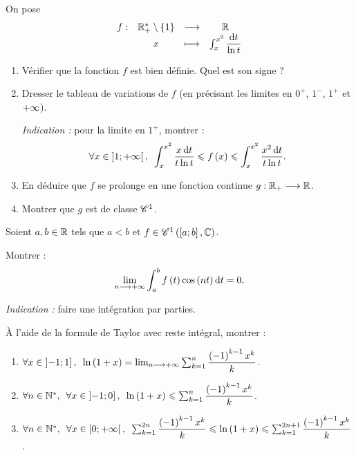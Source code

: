 \begin{exo}
On pose \[\fonction{f}{\Rps\excluant\accol{1}}{\R}{x}{\int_x^{x^2}\dfrac{\odif{t}}{\ln t}}\]

\begin{enumerate}
\item Vérifier que la fonction \(f\) est bien définie. Quel est son signe ? \\

\item Dresser le tableau de variations de \(f\) (en précisant les limites en \(0^+\), \(1^-\), \(1^+\) et \(+\infty\)).

\textit{Indication :} pour la limite en \(1^+\), montrer : \[\quantifs{\forall x\in\intervee{1}{\pinf}}\int_x^{x^2}\dfrac{x\odif{t}}{t\ln t}\leq f\paren{x}\leq\int_x^{x^2}\dfrac{x^2\odif{t}}{t\ln t}.\]

\item En déduire que \(f\) se prolonge en une fonction continue \(g:\mathbb{R}_+\longrightarrow\mathbb{R}\). \\

\item Montrer que \(g\) est de classe \(\mathscr{C}^{1}\).
\end{enumerate}
\end{exo}

\begin{corr}
\end{corr}

\begin{exo}
Soient \(a,b\in\mathbb{R}\) tels que \(a<b\) et \(f\in\mathscr{C}^{1}\left(\left[a;b\right],\mathbb{C}\right)\).

Montrer : \[\lim_{n\to\pinf}\int_a^bf\paren{t}\cos\paren{nt}\odif{t}=0.\]

\textit{Indication :} faire une intégration par parties.
\end{exo}

\begin{corr}
\end{corr}

\begin{exo}
À l'aide de la formule de Taylor avec reste intégral, montrer :

\begin{enumerate}
\item \(\quantifs{\forall x\in\intervei{-1}{1}}\ln\paren{1+x}=\lim_{n\to\pinf}\sum_{k=1}^n\dfrac{\paren{-1}^{k-1}x^k}{k}\). \\

\item \(\quantifs{\forall n\in\Ns;\forall x\in\intervei{-1}{0}}\ln\paren{1+x}\leq\sum_{k=1}^n\dfrac{\paren{-1}^{k-1}x^k}{k}\). \\

\item \(\quantifs{\forall n\in\Ns;\forall x\in\intervie{0}{\pinf}}\sum_{k=1}^{2n}\dfrac{\paren{-1}^{k-1}x^k}{k}\leq\ln\paren{1+x}\leq\sum_{k=1}^{2n+1}\dfrac{\paren{-1}^{k-1}x^k}{k}\).
\end{enumerate}
\end{exo}

